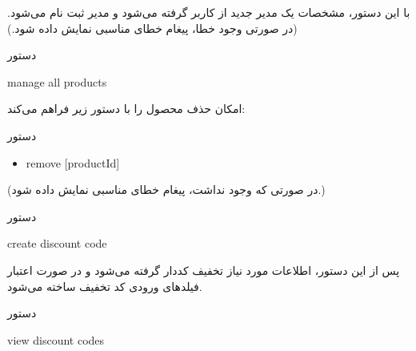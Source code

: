 \documentclass[]{article}
\begin{document}
با این دستور، مشخصات یک مدیر جدید از کاربر گرفته می‌شود و مدیر ثبت نام می‌شود.
(در صورتی وجود خطا، پیغام خطای مناسبی نمایش داده شود.)

\hrulefill


\begin{mybox}[colback=yellow]{دستور}

\begin{latin}

manage all products

\end{latin}

\end{mybox}


امکان حذف محصول را با دستور زیر فراهم می‌کند:


\begin{mybox}[colback=brilliantlavender]{دستور}


\begin{latin}

\begin{itemize}[label = {$\Rightarrow$}]

\item
remove [productId]

\end{itemize}

\end{latin}

\end{mybox}

(در صورتی که  وجود نداشت، پیغام خطای مناسبی نمایش داده شود.)


\hrulefill

\begin{mybox}[colback=yellow]{دستور}

\begin{latin}

create discount code

\end{latin}

\end{mybox}

پس از این دستور، اطلاعات مورد نیاز تخفیف کددار گرفته می‌شود و در صورت اعتبار فیلدهای ورودی کد تخفیف ساخته می‌شود.


\hrulefill


\begin{mybox}[colback=yellow]{دستور}

\begin{latin}

view discount codes

\end{latin}

\end{mybox}
\end{document}
